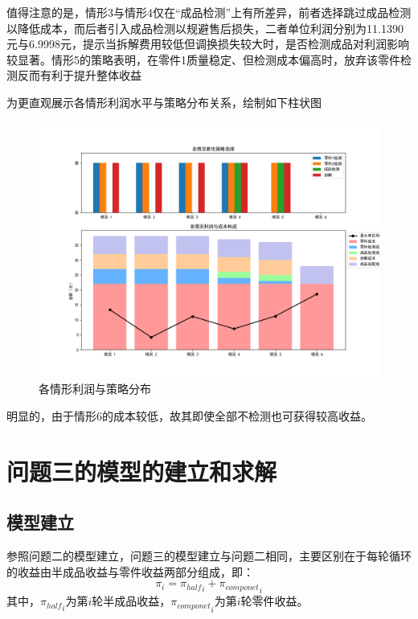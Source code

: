 \documentclass[withoutpreface,bwprint]{cumcmthesis}
\begin{document}
值得注意的是，情形3与情形4仅在“成品检测”上有所差异，前者选择跳过成品检测以降低成本，而后者引入成品检测以规避售后损失，二者单位利润分别为11.1390元与6.9998元，提示当拆解费用较低但调换损失较大时，是否检测成品对利润影响较显著。情形5的策略表明，在零件1质量稳定、但检测成本偏高时，放弃该零件检测反而有利于提升整体收益

为更直观展示各情形利润水平与策略分布关系，绘制如下柱状图
\begin{figure}[H]
\centering
\includegraphics[width=\textwidth]{figure/fuck.png}
\caption{各情形利润与策略分布}
\end{figure}

明显的，由于情形6的成本较低，故其即使全部不检测也可获得较高收益。
\section{问题三的模型的建立和求解}
\subsection{模型建立}
参照问题二的模型建立，问题三的模型建立与问题二相同，主要区别在于每轮循环的收益由半成品收益与零件收益两部分组成，即：
\begin{equation}
\pi_i={\pi_{half}}_i+{\pi_{componet}}_i
\end{equation}
其中，${\pi_{half}}_i$为第$i$轮半成品收益，${\pi_{componet}}_i$为第$i$轮零件收益。
\end{document}
